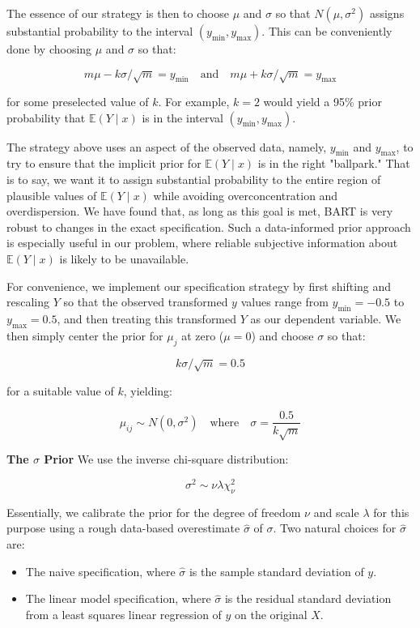 \documentclass[a4paper,11pt]{article}
\begin{document}
The essence of our strategy is then to choose \(\mu\) and \(\sigma\) so that \(N(\mu, \sigma^2)\) assigns substantial probability to the interval \((y_{\text{min}}, y_{\text{max}})\). This can be conveniently done by choosing \(\mu\) and \(\sigma\) so that:

\[
m \mu - k \sigma / \sqrt{m} = y_{\text{min}} \quad \text{and} \quad m \mu + k \sigma / \sqrt{m} = y_{\text{max}}
\]

for some preselected value of \(k\). For example, \(k = 2\) would yield a 95\% prior probability that \(\mathbb{E}(Y \mid x)\) is in the interval \((y_{\text{min}}, y_{\text{max}})\).

The strategy above uses an aspect of the observed data, namely, \(y_{\text{min}}\) and \(y_{\text{max}}\), to try to ensure that the implicit prior for \(\mathbb{E}(Y \mid x)\) is in the right "ballpark." That is to say, we want it to assign substantial probability to the entire region of plausible values of \(\mathbb{E}(Y \mid x)\) while avoiding overconcentration and overdispersion. We have found that, as long as this goal is met, BART is very robust to changes in the exact specification. Such a data-informed prior approach is especially useful in our problem, where reliable subjective information about \(\mathbb{E}(Y \mid x)\) is likely to be unavailable.

For convenience, we implement our specification strategy by first shifting and rescaling \(Y\) so that the observed transformed \(y\) values range from \(y_{\text{min}} = -0.5\) to \(y_{\text{max}} = 0.5\), and then treating this transformed \(Y\) as our dependent variable. We then simply center the prior for \(\mu_j\) at zero (\(\mu = 0\)) and choose \(\sigma\) so that:

\[
k \sigma / \sqrt{m} = 0.5
\]

for a suitable value of \(k\), yielding:

\[
\mu_{ij} \sim N(0, \sigma^2) \quad \text{where} \quad \sigma = \frac{0.5}{k \sqrt{m}}
\]


\textbf{The \( \sigma \) Prior}
We use the inverse chi-square distribution:

\[
\sigma^2 \sim \nu \lambda \chi^2_\nu
\]

Essentially, we calibrate the prior for the degree of freedom \( \nu \) and scale \( \lambda \) for this purpose using a rough data-based overestimate \( \hat{\sigma} \) of \( \sigma \). Two natural choices for \( \hat{\sigma} \) are:

\begin{itemize}
    \item The naive specification, where \( \hat{\sigma} \) is the sample standard deviation of \( y \).
    \item The linear model specification, where \( \hat{\sigma} \) is the residual standard deviation from a least squares linear regression of \( y \) on the original \( X \).
\end{itemize}
\end{document}

